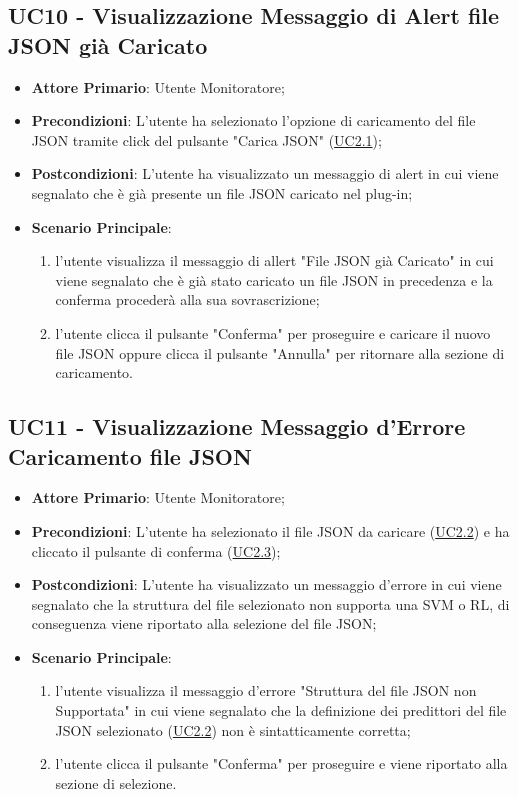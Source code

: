 
	\label{par:UC10}
	\subsection{UC10 - Visualizzazione Messaggio di Alert file JSON già Caricato}
		\begin{itemize}
			\item\textbf{Attore Primario}: Utente Monitoratore;
			\item\textbf{Precondizioni}: L’utente ha selezionato l'opzione di caricamento del file JSON tramite click del pulsante "Carica JSON" (\hyperref[par:UC2.1]{UC2.1});
			\item\textbf{Postcondizioni}: L’utente ha visualizzato un messaggio di alert in cui viene segnalato che è già presente un file JSON caricato nel plug-in; 
			\item\textbf{Scenario Principale}: 
				\begin{enumerate} 
					\item l’utente visualizza il messaggio di allert "File JSON già Caricato" in cui viene segnalato che è già stato caricato un file JSON in precedenza e la conferma procederà alla sua sovrascrizione;
					\item l'utente clicca il pulsante "Conferma" per proseguire e caricare il nuovo file JSON oppure clicca il pulsante "Annulla" per ritornare alla sezione di caricamento.
				\end{enumerate}
		\end{itemize}	


	\label{par:UC11}
	\subsection{UC11 - Visualizzazione Messaggio d'Errore Caricamento file JSON }
		\begin{itemize}
			\item\textbf{Attore Primario}: Utente Monitoratore;
			\item\textbf{Precondizioni}: L’utente ha selezionato il file JSON da caricare (\hyperref[par:UC2.2]{UC2.2}) e ha cliccato il pulsante di conferma (\hyperref[par:UC2.3]{UC2.3});
			\item\textbf{Postcondizioni}: L’utente ha visualizzato un messaggio d'errore in cui viene segnalato che la struttura del file selezionato non supporta una SVM o RL, di conseguenza viene riportato alla selezione del file JSON; 
			\item\textbf{Scenario Principale}: 
				\begin{enumerate} 
					\item l’utente visualizza il messaggio d'errore "Struttura del file JSON non Supportata" in cui viene segnalato che la definizione dei predittori del file JSON selezionato (\hyperref[par:UC2.2]{UC2.2}) non è sintatticamente corretta;
					\item l'utente clicca il pulsante "Conferma" per proseguire e viene riportato alla sezione di selezione.
				\end{enumerate}
		\end{itemize}	

